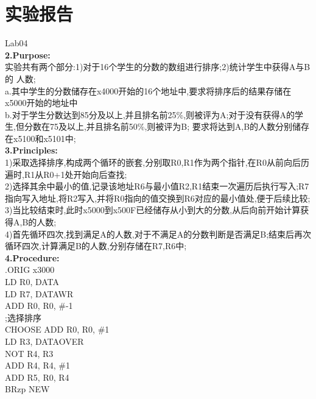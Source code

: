 \documentclass[12pt]{ctexart}
\begin{document}
\section*{实验报告}
Lab04\\
{\bf2.Purpose:}\\
实验共有两个部分:1)对于16个学生的分数的数组进行排序;2)统计学生中获得A与B的
人数;\\
a.其中学生的分数储存在x4000开始的16个地址中,要求将排序后的结果存储在x5000开始的地址中\\
b.对于学生分数达到85分及以上,并且排名前25\%,则被评为A;对于没有获得A的学生,但分数在75及以上,并且排名前50\%,则被评为B;
要求将达到A,B的人数分别储存在x5100和x5101中;\\
{\bf3.Principles:}\\
1)采取选择排序,构成两个循环的嵌套,分别取R0,R1作为两个指针,在R0从前向后历遍时,R1从R0+1处开始向后查找;\\
2)选择其余中最小的值,记录该地址R6与最小值R2,R1结束一次遍历后执行写入;R7指向写入地址,将R2写入,并将R0指向的值交换到R6对应的最小值处,便于后续比较;\\
3)当比较结束时,此时x5000到x500F已经储存从小到大的分数,从后向前开始计算获得A,B的人数;\\
4)首先循环四次,找到满足A的人数,对于不满足A的分数判断是否满足B;结束后再次循环四次,计算满足B的人数,分别存储在R7,R6中;\\
{\bf4.Procedure:}\\
\hspace*{1.5cm}.ORIG x3000\\
\hspace*{1.5cm}LD R0, DATA\\
\hspace*{1.5cm}LD R7, DATAWR\\
\hspace*{1.5cm}ADD R0, R0, \#-1\\
\hspace*{1.5cm};选择排序\\
CHOOSE  ADD R0, R0, \#1\\
\hspace*{1.5cm}LD R3, DATAOVER\\
\hspace*{1.5cm}NOT R4, R3\\
\hspace*{1.5cm}ADD R4, R4, \#1\\
\hspace*{1.5cm}ADD R5, R0, R4\\
\hspace*{1.5cm}BRzp NEW\\
\end{document}
